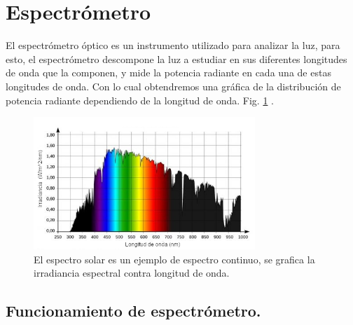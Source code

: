 \section{Espectrómetro}
El espectrómetro óptico es un instrumento utilizado para analizar la luz, para esto, el espectrómetro descompone la luz a estudiar en sus diferentes longitudes de onda que la componen, y mide la potencia radiante en cada una de estas longitudes de onda. Con lo cual obtendremos una gráfica de la distribución de potencia radiante dependiendo de la longitud de onda. Fig. \ref{fig:espectrosol} \cite{B&WTek2016}. 

\begin{figure}[h!]
	\centering
	\includegraphics[width=0.9\linewidth,height=5cm]{Imagenes/espectroSOL}
	\caption[Espectro continuo, luz solar \cite{SolarLight}.]{El espectro solar es un ejemplo de espectro continuo, se grafica la irradiancia espectral contra longitud de onda.}
	\label{fig:espectrosol}
\end{figure}
\subsection{Funcionamiento de espectrómetro.}


